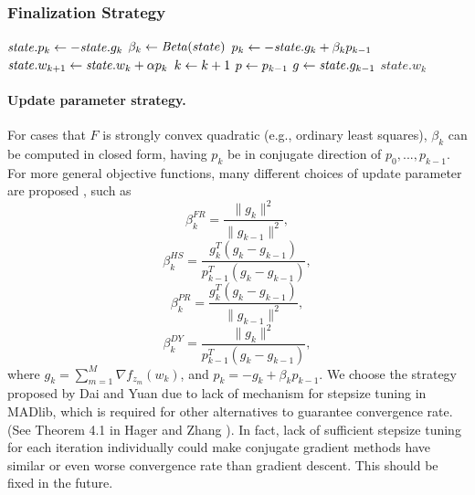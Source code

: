 \subsubsection{Finalization Strategy}
\begin{algorithm} \label{alg:finalization-cg}
\begin{algorithmic}[1]
        \State $\mathit{state}.p_k \leftarrow - \mathit{state}.g_k$
    \Else
        \State $\beta_k \leftarrow \mathit{Beta}(state)$
        \State $p_k \leftarrow - \mathit{state}.g_k + \beta_k p_{k-1}$
    \EndIf
    \State $\mathit{state}.w_{k+1} \leftarrow \mathit{state}.w_k + \alpha p_k$
    \State $k \leftarrow k + 1$
    \State $p \leftarrow p_{k-1}$
    \State $g \leftarrow \mathit{state}.g_{k-1}$
    \State \Return $\mathit{state}.w_k$
\end{algorithmic}
\end{algorithm}

\paragraph{Update parameter strategy.}
For cases that $F$ is strongly convex quadratic (e.g., ordinary least squares), $\beta_k$ can be computed in closed form, having $p_k$ be in conjugate direction of $p_0,...,p_{k-1}$.
For more general objective functions, many different choices of update parameter are proposed \cite{hager2006survey, nocedal2006numerical}, such as
\[\beta_k^{FR} = \frac{\|g_k\|^2}{\|g_{k-1}\|^2},\]
\[\beta_k^{HS} = \frac{g_k^T (g_k - g_{k-1})}{p_{k-1}^T (g_k - g_{k-1})},\]
\[\beta_k^{PR} = \frac{g_k^T (g_k - g_{k-1})}{\|g_{k-1}\|^2},\]
\[\beta_k^{DY} = \frac{\|g_k\|^2}{p_{k-1}^T (g_k - g_{k-1})},\]
where $g_k = \sum_{m=1}^M \nabla f_{z_m}(w_k)$, and $p_k = - g_k + \beta_k p_{k-1}$.
We choose the strategy proposed by Dai and Yuan due to lack of mechanism for stepsize tuning in MADlib, which is required for other alternatives to guarantee convergence rate. (See Theorem 4.1 in Hager and Zhang \cite{hager2006survey}).
In fact, lack of sufficient stepsize tuning for each iteration individually could make conjugate gradient methods have similar or even worse convergence rate than gradient descent.
This should be fixed in the future.

